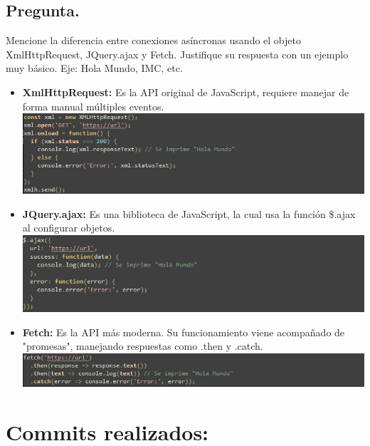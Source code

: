 \documentclass{article}
\begin{document}
\subsection*{Pregunta.}
Mencione la diferencia entre conexiones asíncronas usando el objeto XmlHttpRequest, JQuery.ajax y Fetch. Justifique su respuesta con un ejemplo muy básico. Eje: Hola Mundo, IMC, etc.
\begin{itemize}
\item \textbf{XmlHttpRequest: } Es la API original de JavaScript, requiere manejar de forma manual múltiples eventos.\\



\includegraphics[width=\textwidth]{img/xml.png}
\item \textbf{JQuery.ajax: } Es una biblioteca de JavaScript, la cual usa la función \$.ajax al configurar objetos.\\



\includegraphics[width=\textwidth]{img/ajax.png}
\item \textbf{Fetch: } Es la API más moderna. Su funcionamiento viene acompañado de "promesas", manejando respuestas como .then y .catch.\\



\includegraphics[width=\textwidth]{img/fetch.png}
\end{itemize}
\section{Commits realizados:}
\end{document}

